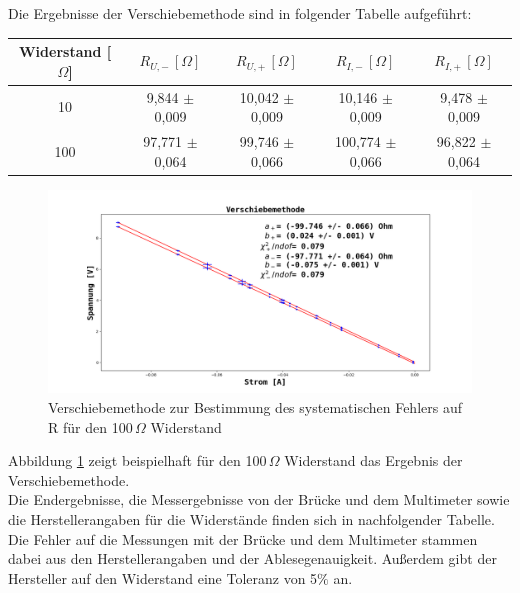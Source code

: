 \documentclass[12pt,a4paper]{article}
\begin{document}
Die Ergebnisse der Verschiebemethode sind in folgender Tabelle aufgeführt: \\

\begin{center}
\begin{tabular}{|c|c|c|c|c|}
\hline 
Widerstand [$\Omega$] & $R_{U, -} \, [\Omega]$ & $R_{U, +} \, [\Omega]$ & $R_{I, -} \, [\Omega]$ & $R_{I, +} \, [\Omega]$ \\ 
\hline 
10 & 9,844 $\pm$ 0,009 & 10,042 $\pm$ 0,009 & 10,146 $\pm$ 0,009 & 9,478 $\pm$ 0,009 \\ 
\hline 
100 & 97,771 $\pm$ 0,064 & 99,746 $\pm$ 0,066 & 100,774 $\pm$ 0,066 & 96,822 $\pm$ 0,064 \\ 
\hline 
\end{tabular} 
\end{center}

\begin{figure}
\begin{center}
\includegraphics[scale=0.45]{Bilder/Verschiebemethode_Widerstand.png}
\end{center}
\caption[Widerstand Verschiebemethode]{Verschiebemethode zur Bestimmung des systematischen Fehlers auf R für den 100$\, \Omega$ Widerstand}
\label{fig:Widerstand_Verschiebemethode}
\end{figure}

Abbildung \ref{fig:Widerstand_Verschiebemethode} zeigt beispielhaft für den 100$\, \Omega$ Widerstand das Ergebnis der Verschiebemethode. \\
Die Endergebnisse, die Messergebnisse von der Brücke und dem Multimeter sowie die Herstellerangaben für die Widerstände finden sich in nachfolgender Tabelle. Die Fehler auf die Messungen mit der Brücke und dem Multimeter stammen dabei aus den Herstellerangaben und der Ablesegenauigkeit. Außerdem gibt der Hersteller auf den Widerstand eine Toleranz von 5$\%$ an. \\
\end{document}
